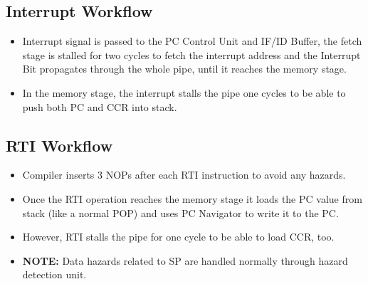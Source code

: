 \subsection{Interrupt Workflow}
\begin{itemize}
    \item Interrupt signal is passed to the PC Control Unit and IF/ID Buffer, the fetch stage is stalled for two cycles to fetch the interrupt address and the Interrupt Bit propagates through the whole pipe, until it reaches the memory stage.
    \item In the memory stage, the interrupt stalls the pipe one cycles to be able to push both PC and CCR into stack.
\end{itemize}

\subsection{RTI Workflow}
\begin{itemize}
    \item Compiler inserts 3 NOPs after each RTI instruction to avoid any hazards.
    \item  Once the RTI operation reaches the memory stage it loads the PC value from stack (like a normal POP) and uses PC Navigator to write it to the PC.
    \item However, RTI stalls the pipe for one cycle to be able to load CCR, too.
    \item \textbf{NOTE:} Data hazards related to SP are handled normally through hazard detection unit.
\end{itemize}